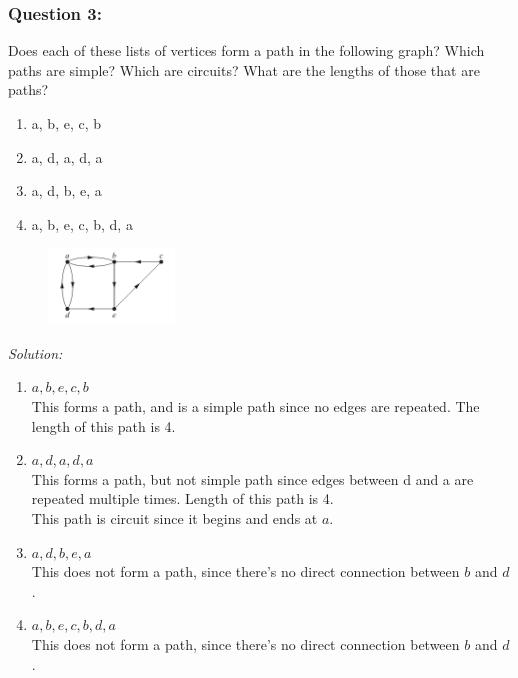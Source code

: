 \documentclass[a4paper]{article}
\begin{document}
	\subsubsection*{Question 3:}
	Does each of these lists of vertices form a path in the following graph? Which paths are simple? Which are circuits? What are the lengths of those that are paths?
	\begin{enumerate}[label=\alph*)]
		\item a, b, e, c, b
		\item a, d, a, d, a
		\item a, d, b, e, a
		\item a, b, e, c, b, d, a
	\end{enumerate}
	\begin{figure}[H]
		\centering
		\includegraphics[width=0.3\textwidth]{tut93.png}
	\end{figure}
	\textit{Solution:} \\
	\begin{enumerate}[label = \alph*)]
		\item  
		      $a, b, e, c, b$ \\
		      This forms a path, and is a simple path since no edges are repeated. The length of this path is 4.
		\item 
		      $a, d, a, d, a$ \\
		      This forms a path, but not simple path since edges between d and a are repeated multiple times. Length of this path is 4.\\
		      This path is circuit since it begins and ends at $a$.
		\item
		      $a, d, b, e, a$ \\
		      This does not form a path, since there's no direct connection between $b$ and $d$.
		\item 
		      $a, b, e, c, b, d, a$ \\
		      This does not form a path, since there's no direct connection between $b$ and $d$.
	\end{enumerate}
	
	
	
	
\end{document}
